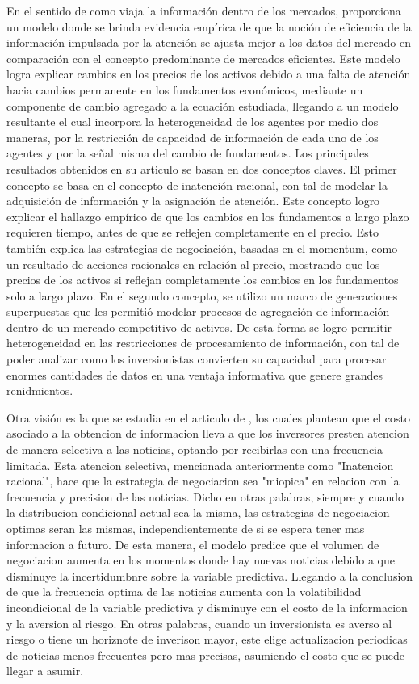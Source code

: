 En el sentido de como viaja la información dentro de los mercados,  proporciona un modelo donde se brinda evidencia empírica de que la noción de eficiencia de la información impulsada por la atención se ajusta mejor a los datos del mercado en comparación con el concepto predominante de mercados eficientes. Este modelo logra explicar cambios en los precios de los activos debido a una falta de atención hacia cambios permanente en los fundamentos económicos, mediante un componente de cambio agregado a la ecuación estudiada, llegando a un modelo resultante el cual incorpora la heterogeneidad de los agentes por medio dos maneras, por la restricción de capacidad de información de cada uno de los agentes y por la señal misma del cambio de fundamentos. Los principales resultados obtenidos en su articulo se basan en dos conceptos claves. El primer concepto se basa en el concepto de inatención racional, con tal de modelar la adquisición de información y la asignación de atención. Este concepto logro explicar el hallazgo empírico de que los cambios en los fundamentos a largo plazo requieren tiempo, antes de que se reflejen completamente en el precio. Esto también explica las estrategias de negociación, basadas en el momentum, como un resultado de acciones racionales en relación al precio, mostrando que los precios de los activos si reflejan completamente los cambios en los fundamentos solo a largo plazo. En el segundo concepto, se utilizo un marco de generaciones superpuestas que les permitió modelar procesos de agregación de información dentro de un mercado competitivo de activos. De esta forma se logro permitir heterogeneidad en las restricciones de procesamiento de información, con tal de poder analizar como los inversionistas convierten su capacidad para procesar enormes cantidades de datos en una ventaja informativa que genere grandes renidmientos.

\vspace{0.5cm}

Otra visión es la que se estudia en el articulo de , los cuales plantean que el costo asociado a la obtencion de  informacion lleva a que los inversores presten atencion de manera selectiva a las noticias, optando por recibirlas con una frecuencia limitada. Esta atencion selectiva, mencionada anteriormente como "Inatencion racional", hace que la estrategia de negociacion sea "miopica" en relacion con la frecuencia y precision de las noticias. Dicho en otras palabras, siempre y cuando la distribucion condicional actual sea la misma, las estrategias de negociacion optimas seran las mismas, independientemente de si se espera tener mas informacion a futuro. De esta manera, el modelo predice que el volumen de negociacion aumenta en los momentos donde hay nuevas noticias debido a que disminuye la incertidumbnre sobre la variable predictiva. Llegando a la conclusion de que la frecuencia optima de las noticias aumenta con la volatibilidad incondicional de la variable predictiva y disminuye con el costo de la informacion y la aversion al riesgo. En otras palabras, cuando un inversionista es averso al riesgo o tiene un horiznote de inverison mayor, este elige actualizacion periodicas de noticias menos frecuentes pero mas precisas, asumiendo el costo que se puede llegar a asumir.

